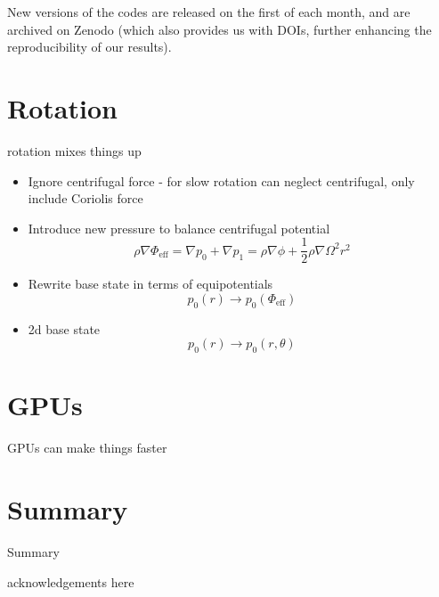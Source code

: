 \documentclass[a4paper]{jpconf}
\begin{document}
New versions of the codes are released on the first of each month, and are archived on Zenodo (which also provides us with DOIs, further enhancing the reproducibility of our results).


\section{Rotation} \label{sec:rotation}
rotation mixes things up

\begin{itemize}
\item Ignore centrifugal force - for slow rotation can neglect centrifugal, only include Coriolis force
\item Introduce new pressure to balance centrifugal potential $$\rho \nabla \Phi_{\text{eff}} = \nabla p_0 + \nabla p_1 = \rho \nabla \phi + \frac{1}{2}\rho \nabla\Omega^2 r^2$$
\item Rewrite base state in terms of equipotentials $$p_0(r) \rightarrow p_0(\Phi_{\text{eff}}) $$
\item 2d base state $$p_0(r)  \rightarrow p_0(r, \theta)$$
\end{itemize}


\section{GPUs} \label{sec:gpus}
GPUs can make things faster


\section{Summary} \label{sec:summary}

Summary 


\ack acknowledgements here %




\end{document}
